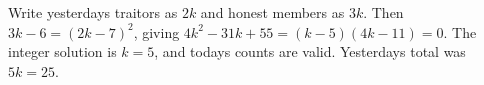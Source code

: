 Write yesterday\textquotesingle s traitors as $2k$ and honest members as $3k$. Then $3k-6=(2k-7)^2$, giving $4k^2-31k+55=(k-5)(4k-11)=0$. The integer solution is $k=5$, and today\textquotesingle s counts are valid. Yesterday\textquotesingle s total was $5k=\boxed{25}$.

